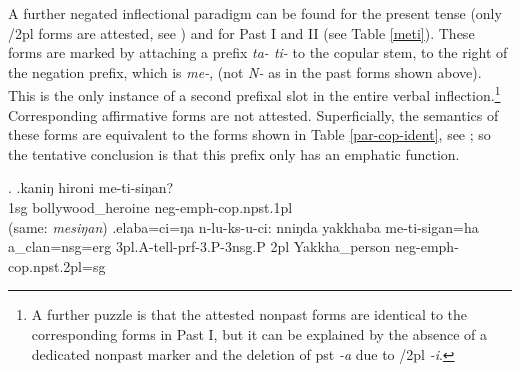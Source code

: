  
A further negated inflectional paradigm can be found for the present tense (only {/2pl} forms are attested, see \Next) and for Past I and II (see Table \ref{meti}). These forms are marked by attaching a prefix \emph{ta- \ti ti-} to the copular stem, to the right of the negation prefix, which is  \emph{me-}, (not \emph{N-} as in the past forms shown above). This is the only instance of a second prefixal slot in the entire verbal inflection.\footnote{A further puzzle is that the attested nonpast forms are identical to the corresponding forms in Past I, but it can be explained by the absence of a dedicated nonpast marker and the deletion of {\sc pst} \emph{-a} due to {/2pl} \emph{-i}.}  Corresponding affirmative forms are not attested. Superficially, the semantics of these forms are equivalent to the forms shown in Table \ref{par-cop-ident}, see \Next[a]; so the tentative conclusion is that this prefix only has an emphatic function.

\ex. \ag.kaniŋ hironi me-ti-siŋan?\\
{\sc 1sg} bollywood\_heroine {\sc neg-emph-cop.npst.1pl}\\
 (same: \emph{mesiŋan})
\bg.elaba=ci=ŋa n-lu-ks-u-ci:     nniŋda yakkhaba    me-ti-sigan=ha\\
a\_clan{\sc =nsg=erg} {\sc 3pl.A-}tell{\sc -prf-3.P-3nsg.P}  {\sc 2pl} Yakkha\_person {\sc neg-emph-cop.npst.2pl=sg}\\
 

